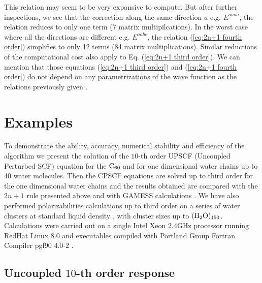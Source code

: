 \documentclass[prl,aps,twocolumn,showpacs,twocolumngrid,superbib]{revtex4}
\def\Tr{{\rm Tr}}
\begin{document}
This relation may seem to be very expansive to compute. But after further
inspections, we see that the correction along the same direction $a$ e.g. $E^{aaaa}$,
the relation reduces to only one term (7 matrix multipilcations).
In the worst case where all the directions are different e.g. $E^{aabc}$, the
relation (\ref{eq:2n+1 fourth order}) simplifies to only 12 
terms (84 matrix multiplications). 
Similar reductions of the computational cost also apply to 
Eq. (\ref{eq:2n+1 third order}).
We can mention that those equations 
(\ref{eq:2n+1 third order}) and (\ref{eq:2n+1 fourth order}) 
do not depend on any parametrizations of the wave function
as the relations previously given \cite{Helgaker_2001,Dupuis_1991}.




\section{Examples}
To demonstrate the ability, accuracy, numerical stability and efficiency 
of the algorithm we present
the solution of the $10$-th order UPSCF (Uncoupled Perturbed SCF) 
equation for the $\rm C_{60}$ and for one dimensional water chains up to
40 water molecules. 
Then the CPSCF equations are solved up to third order for the one dimensional 
water chains and the results obtained are compared with the $2n+1$ rule presented 
above and with GAMESS calculations \cite{gamess}. We have also 
performed polarizabilities
calculations up to third order on a series of water clusters at standard 
liquid density \cite{MChallacombe97,ESchwegler97}, with 
cluster sizes up to $(\rm H_2O)_{150}$. 
Calculations were carried out on a single Intel Xeon 2.4GHz processor 
running RedHat Linux 8.0 and  executables compiled
with Portland Group Fortran Compiler pgf90 4.0-2 \cite{PGF90}.

\subsection{Uncoupled $10$-th order response}
\end{document}
